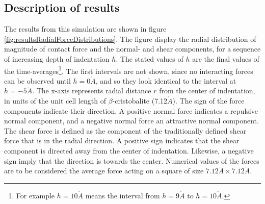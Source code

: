 \documentclass[twoside,english]{uiofysmaster}
\begin{document}
\subsection{Description of results}
The results from this simulation are shown in figure \ref{fig:resultsRadialForceDistributions}. 
The figure display the radial distribution of magnitude of contact force and the normal- and shear components, for a sequence of increasing depth of indentation $h$. 
The stated values of $h$ are the final values of the time-averages\footnote{For example $h=10\mathring{A}$ means the interval from $h=9\mathring{A}$ to $h=10\mathring{A}$.}.    
The first intervals are not shown, since no interacting forces can be observed until $h=0\mathring{A}$, and so they look identical to the interval at $h=-5\mathring{A}$.
The x-axis represents radial distance $r$ from the center of indentation, in units of the unit cell length of $\beta$-cristobalite (7.12$\mathring{A}$). 
The sign of the force components indicate their direction.
A positive normal force indicates a repulsive normal component, and a negative normal force an attractive normal component. 
The shear force is defined as the component of the traditionally defined shear force that is in the radial direction. 
A positive sign indicates that the shear component is directed away from the center of indentation.
Likewise, a negative sign imply that the direction is towards the center. 
Numerical values of the forces are to be considered the average force acting on a square of size $7.12\mathring{A}\times7.12\mathring{A}$.  
\end{document}
